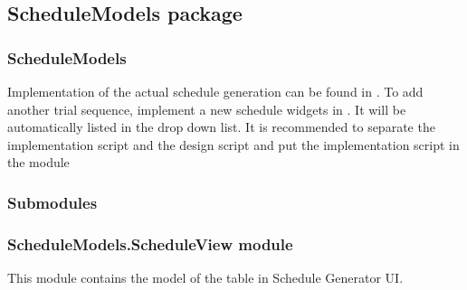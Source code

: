 \documentclass[letterpaper,10pt,english]{sphinxmanual}
\begin{document}
\sphinxstepscope


\subsection{ScheduleModels package}
\label{\detokenize{NoSeMazeSchedule/ScheduleModels:schedulemodels-package}}\label{\detokenize{NoSeMazeSchedule/ScheduleModels::doc}}

\subsubsection{ScheduleModels}
\label{\detokenize{NoSeMazeSchedule/ScheduleModels:schedulemodels}}
\sphinxAtStartPar
Implementation of the actual schedule generation can be found in . To add another trial sequence, implement a new schedule widgets in . It will be automatically listed in the drop down list. It is recommended to separate the implementation script and the design script and put the implementation script in the module 


\subsubsection{Submodules}
\label{\detokenize{NoSeMazeSchedule/ScheduleModels:submodules}}

\subsubsection{ScheduleModels.ScheduleView module}
\label{\detokenize{NoSeMazeSchedule/ScheduleModels:module-ScheduleModels.ScheduleView}}\label{\detokenize{NoSeMazeSchedule/ScheduleModels:schedulemodels-scheduleview-module}}
\sphinxAtStartPar
This module contains the model of the table in Schedule Generator UI.
\end{document}
